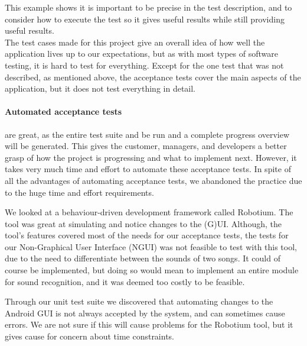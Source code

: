 This example shows it is important to be precise in the test description, and to consider how to execute the test so it gives useful results while still providing useful results.\\

The test cases made for this project give an overall idea of how well the application lives up to our expectations, but as with most types of software testing, it is hard to test for everything.
Except for the one test that was not described, as mentioned above, the acceptance tests cover the main aspects of the application, but it does not test everything in detail.


%
%
%


\paragraph{Automated acceptance tests} are great, as the entire test suite and be run and a complete progress overview will be generated.
This gives the customer, managers, and developers a better grasp of how the project is progressing and what to implement next.
However, it takes very much time and effort to automate these acceptance tests.
In spite of all the advantages of automating acceptance tests, we abandoned the practice due to the huge time and effort requirements.

We looked at a behaviour-driven development framework called Robotium.
The tool was great at simulating and notice changes to the (G)UI.
Although, the tool's features covered most of the needs for our acceptance tests, the tests for our Non-Graphical User Interface (NGUI) was not feasible to test with this tool, due to the need to differentiate between the sounds of two songs.
It could of course be implemented, but doing so would mean to implement an entire module for sound recognition, and it was deemed too costly to be feasible. 

Through our unit test suite we discovered that automating changes to the Android GUI is not always accepted by the system, and can sometimes cause errors.
We are not sure if this will cause problems for the Robotium tool, but it gives cause for concern about time constraints.





